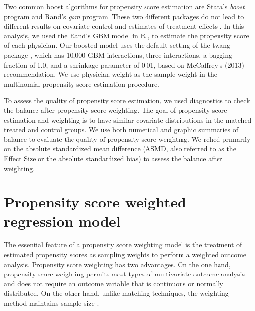 \documentclass[12pt]{report}
\begin{document}
Two common boost algorithms for propensity score estimation are Stata's \textit{boost} program and Rand's \textit{gbm} program. These two different packages do not lead to different results on covariate control and estimates of treatment effects \citep{guo2014propensity}. In this analysis, we used the Rand's GBM model \citep{mccaffrey2004propensity} in R \citep{rbase}, to estimate the propensity score of each physician. Our boosted model uses the default setting of the twang package \citep{mccaffrey2013tutorial}, which has 10,000 GBM interactions, three interactions, a bagging fraction of 1.0, and a shrinkage parameter of 0.01, based on McCaffrey's (2013) recommendation. We use physician weight as the sample weight in the multinomial propensity score estimation procedure.

To assess the quality of propensity score estimation, we used diagnostics to check the balance after propensity score weighting. The goal of propensity score estimation and weighting is to have similar covariate distributions in the matched treated and control groups. We use both numerical and graphic summaries of balance to evaluate the quality of propensity score weighting. We relied primarily on the absolute standardized mean difference (ASMD, also referred to as the Effect Size or the absolute standardized bias) to assess the balance after weighting. 

\section{Propensity score weighted regression model}
\label{sec:model}
The essential feature of a propensity score weighting model is the treatment of estimated propensity scores as sampling weights to perform a weighted outcome analysis. Propensity score weighting has two advantages. On the one hand, propensity score weighting permits most types of multivariate outcome analysis and does not require an outcome variable that is continuous or normally distributed. On the other hand, unlike matching techniques, the weighting method maintains sample size \citep{guo2014propensity}.
\end{document}
